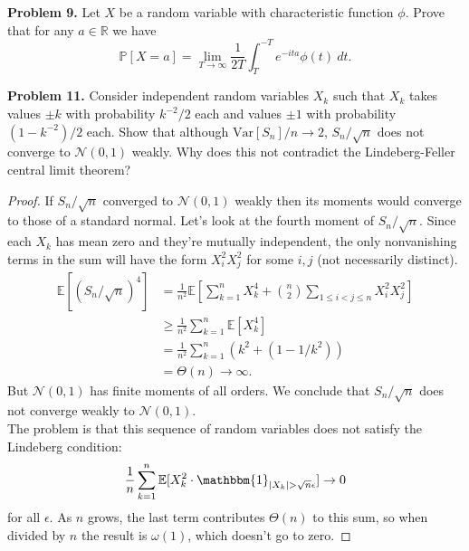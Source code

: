 \documentclass[11pt,letterpaper]{report}
\newcommand{\reals}{\mathbb{R}}
\newcommand{\mcal}[1]{\mathcal{#1}}
\newcommand{\E}{\mathbb{E}}
\newcommand{\Prob}{\mathbb{P}}
\newcommand{\Var}{\text{Var}}
\newcommand{\ind}{\mathbbm{1}}
\begin{document}
\noindent\textbf{Problem 9. }
Let $X$ be a random variable with characteristic function $\phi$. Prove that for any $a\in \reals$ we have
\[
\Prob[X = a] = \lim_{T\to \infty}\frac{1}{2T}\int_{T}^{-T}e^{-ita}\phi(t)\ dt.
\]

\noindent\textbf{Problem 11. }
Consider independent random variables $X_k$ such that $X_k$ takes values $\pm k$ with probability $k^{-2}/2$ each and values $\pm 1$ with probability $(1-k^{-2})/2$ each. Show that although $\Var[S_n]/n\to 2$, $S_n/\sqrt{n}$ does not converge to $\mcal{N}(0, 1)$ weakly. Why does this not contradict the Lindeberg-Feller central limit theorem?
\begin{proof}
	If $S_n/\sqrt{n}$ converged to $\mcal{N}(0, 1)$ weakly then its moments would converge to those of a standard normal. Let's look at the fourth moment of $S_n/\sqrt{n}$. Since each $X_k$ has mean zero and they're mutually independent, the only nonvanishing terms in the sum will have the form $X_i^2X_j^2$ for some $i, j$ (not necessarily distinct).
	\begin{align*}
		\E[(S_n/\sqrt{n})^4] &= \frac{1}{n^2}\E\left[\sum_{k=1}^nX_k^4 + \binom{n}{2}\sum_{1\leq i<j\leq n}X_i^2X_j^2\right]\\
		&\geq \frac{1}{n^2}\sum_{k=1}^n\E[X_k^4]\\
		&= \frac{1}{n^2}\sum_{k=1}^n\left(k^2 + (1-1/k^2)\right)\\
		&= \Theta(n) \to \infty.
	\end{align*}
	But $\mcal{N}(0, 1)$ has finite moments of all orders. We conclude that $S_n/\sqrt{n}$ does not converge weakly to $\mcal{N}(0, 1)$.\\

	\noindent The problem is that this sequence of random variables does not satisfy the Lindeberg condition:
	\[
	\frac{1}{n}\sum_{k=1}^n\E[X_k^2\cdot \ind_{|X_k| > \sqrt{n}\epsilon}] \to 0
	\]
	for all $\epsilon$. As $n$ grows, the last term contributes $\Theta(n)$ to this sum, so when divided by $n$ the result is $\omega(1)$, which doesn't go to zero. 
\end{proof}
\end{document}

